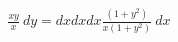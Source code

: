 \documentclass[preview]{standalone}
\begin{document}
\begin{align*}
\frac{x y}{x} \  dy = dx dx dx \frac{\left( 1 + {y}^{2} \right)}{x \left( 1 + {y}^{2} \right)} \  dx
\end{align*}
\end{document}
